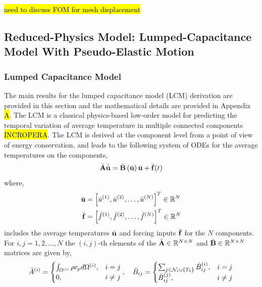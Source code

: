 \hl{need to discuss FOM for mesh displacement}

\subsection{Reduced-Physics Model: Lumped-Capacitance Model With Pseudo-Elastic Motion}


\subsubsection{Lumped Capacitance Model}
The main results for the lumped capacitance model (LCM) derivation are provided in this section and the mathematical details are provided in Appendix \hl{A}. The LCM is a classical physics-based low-order model for predicting the temporal variation of average temperature in multiple connected components \hl{INCROPERA}. The LCM is derived at the component level from a point of view of energy conservation, and leads to the following system of ODEs for the average temperatures on the components,
\begin{equation}
    \bar{\mathbf{A}}\dot{\bar{\mathbf{u}}} = \bar{\mathbf{B}}\left(\bar{\mathbf{u}}\right)\bar{\mathbf{u}} + \bar{\mathbf{f}}(t)\label{eqn_lcm}
\end{equation}
where,
\begin{subequations}
    \begin{align}
       \bar{\mathbf{u}} &= \left[\bar{u}^{(1)},\bar{u}^{(2)},\dots,\bar{u}^{(N)}\right]^T\in\mathbb{R}^{N}\\
        \bar{\mathbf{f}} &= \left[\bar{f}^{(1)},\bar{f}^{(2)},\dots,\bar{f}^{(N)}\right]^T\in\mathbb{R}^{N}
    \end{align}
\end{subequations}
includes the average temperatures $\bar{\mathbf{u}}$ and forcing inputs $\bar{\mathbf{f}}$ for the $N$ components. For $i,j=1,2,\dots,N$ the $(i,j)$-th elements of the $\bar{\mathbf{A}}\in\mathbb{R}^{N\times N}$ and $\bar{\mathbf{B}}\in\mathbb{R}^{N\times N}$ matrices are given by,
\begin{equation}
    \bar{A}^{(i)} = \begin{cases}
            \int_{\Omega^{(i)}}\rho c_p d\Omega^{(i)}, & i=j\\
            0, & i\neq j
        \end{cases},\quad \bar{B}_{ij} = \begin{cases}
        \sum_{j\in\mathcal{N}_i\cup\left\{T_b\right\}}\bar{B}^{(i)}_{ij}, &i=j \\
        \bar{B}^{(j)}_{ij}, & i\neq j
    \end{cases}
\end{equation}

